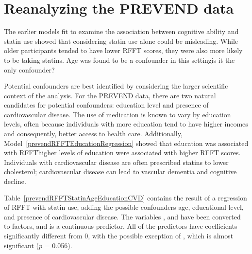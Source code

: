 \section{Reanalyzing the PREVEND data}
\label{reanalyzingStatinDataSet}

The earlier models fit to examine the association between cognitive ability and statin use showed that considering statin use alone could be misleading. While older participants tended to have lower RFFT scores, they were also more likely to be taking statins. Age was found to be a confounder in this setting\textemdash is it the only confounder?

Potential confounders are best identified by considering the larger scientific context of the analysis. For the PREVEND data, there are two natural candidates for potential confounders: education level and presence of cardiovascular disease. The use of medication is known to vary by education levels, often because individuals with more education tend to have higher incomes and consequently, better access to health care. Additionally, Model~\ref{prevendRFFTEducationRegression} showed that education was associated with RFFT\textemdash higher levels of education were associated with higher RFFT scores. Individuals with cardiovascular disease are often prescribed statins to lower cholesterol; cardiovascular disease can lead to vascular dementia and cognitive decline.

Table~\ref{prevendRFFTStatinAgeEducationCVD} contains the result of a regression of RFFT with statin use, adding the possible confounders age, educational level, and presence of cardiovascular disease. The variables ,  and  have been converted to factors, and  is a continuous predictor.  All of the predictors have coefficients significantly different from 0, with the possible exception of , which is almost significant ($p$ = 0.056).  

